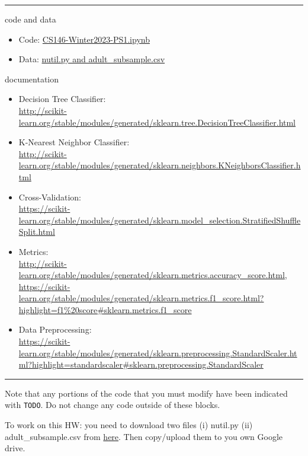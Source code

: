 \vspace{-\baselineskip}
\rule{\textwidth}{1pt}
code and data
\begin{itemize}[nolistsep]
    \item Code: \href{https://drive.google.com/file/d/10CFm6dfRr3WXjERC6sE682xVZhaewCPj/view?usp=share_link}{CS146-Winter2023-PS1.ipynb}\item Data: \href{https://drive.google.com/drive/folders/1bD0QyIc5Vum7g3kNpQ8yPz6EDPuzfasN?usp=sharing}{nutil.py and adult\_subsample.csv} 


\end{itemize}
documentation
\begin{itemize}[nolistsep]
\item Decision Tree Classifier: \\{\footnotesize \url{http://scikit-learn.org/stable/modules/generated/sklearn.tree.DecisionTreeClassifier.html}}
\item K-Nearest Neighbor Classifier: \\{\footnotesize \url{http://scikit-learn.org/stable/modules/generated/sklearn.neighbors.KNeighborsClassifier.html}} 
\item Cross-Validation: \\{\footnotesize \url{https://scikit-learn.org/stable/modules/generated/sklearn.model_selection.StratifiedShuffleSplit.html}}
\item Metrics: \\ {\footnotesize \url{http://scikit-learn.org/stable/modules/generated/sklearn.metrics.accuracy_score.html}, \\
\url{https://scikit-learn.org/stable/modules/generated/sklearn.metrics.f1_score.html?highlight=f1%20score#sklearn.metrics.f1_score}} 
\item Data Preprocessing: \\{\footnotesize \url{https://scikit-learn.org/stable/modules/generated/sklearn.preprocessing.StandardScaler.html?highlight=standardscaler#sklearn.preprocessing.StandardScaler}}
\end{itemize}
\vspace{-\baselineskip}
\rule{\textwidth}{1pt}


Note that any portions of the code that you must modify have been indicated with \verb|TODO|. Do not change any code outside of these blocks.
\fi

To work on this HW: you need to download two files (i) nutil.py (ii) adult\_subsample.csv from  \href{https://drive.google.com/drive/folders/1bD0QyIc5Vum7g3kNpQ8yPz6EDPuzfasN?usp=sharing}{here}. Then copy/upload them to you own Google drive. 

